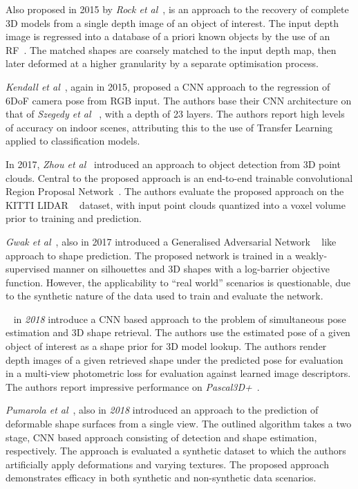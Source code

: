 Also proposed in 2015 by \textit{Rock et al}~\cite{Rock2015}, is an approach to the recovery of complete 
3D models from a single depth image of an object of interest. The input depth image is regressed into a 
database of a priori known objects by the use of an RF~\cite{Ho1995}. The matched shapes are 
coarsely matched to the input depth map, then later deformed at a higher granularity by a separate 
optimisation process.

\textit{Kendall et al}~\cite{Kendall2015}, again in 2015, proposed a CNN approach to the regression of 
6DoF camera pose from RGB input. The authors base their CNN architecture on that of \textit{Szegedy et al}
~\cite{Szegedy2014}, with a depth of 23 layers. The authors report high levels of accuracy on indoor scenes, 
attributing this to the use of Transfer Learning~\cite{Pan2010} applied to classification models.

In 2017, \textit{Zhou et al}~\cite{Zhou2017} introduced an approach to object detection from 3D point 
clouds. Central to the proposed approach is an end-to-end trainable convolutional Region Proposal 
Network~\cite{Girshick2015_2}. The authors evaluate the proposed approach on the KITTI LIDAR
~\cite{Geiger2013} dataset, with input point clouds quantized into a voxel volume prior to training 
and prediction.

\textit{Gwak et al}~\cite{Gwak2017}, also in 2017 introduced a Generalised Adversarial Network
~\cite{Goodfellow2014} like approach to shape prediction. The proposed network is trained in a 
weakly-supervised manner on silhouettes and 3D shapes with a log-barrier objective function. 
However, the applicability to ``real world'' scenarios is questionable, due to the synthetic nature of 
the data used to train and evaluate the network.

~\cite{Grabner18} in \textit{2018} introduce a CNN based approach to the problem of 
simultaneous pose estimation and 3D shape retrieval. The authors use the estimated pose of a given 
object of interest as a shape prior for 3D model lookup. The authors render depth images of a given retrieved 
shape under the predicted pose for evaluation in a multi-view photometric loss for evaluation against 
learned image descriptors. The authors report impressive performance on \textit{Pascal3D+}~\cite{Xiang2014}.

\textit{Pumarola et al}~\cite{Pumarola2018}, also in \textit{2018} introduced an approach to the prediction 
of deformable shape surfaces from a single view. The outlined algorithm takes a two stage, CNN based approach 
consisting of detection and shape estimation, respectively. The approach is evaluated a synthetic dataset to 
which the authors artificially apply deformations and varying textures. The proposed approach demonstrates 
efficacy in both synthetic and non-synthetic data scenarios.

